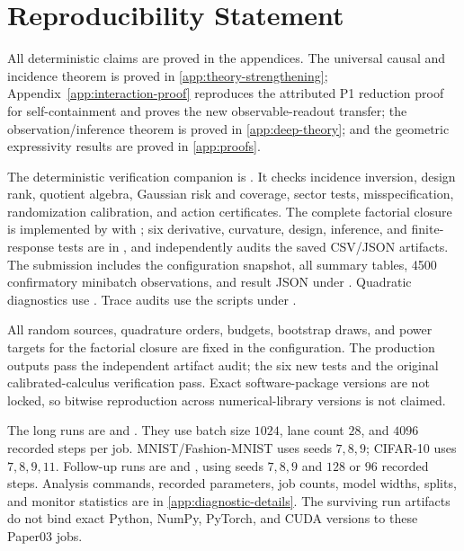 \section{Reproducibility Statement}
\label{sec:reproducibility}

All deterministic claims are proved in the appendices.  The universal causal and incidence theorem is proved in \cref{app:theory-strengthening}; Appendix~\ref{app:interaction-proof} reproduces the attributed P1 reduction proof for self-containment and proves the new observable-readout transfer; the observation/inference theorem is proved in \cref{app:deep-theory}; and the geometric expressivity results are proved in \cref{app:proofs}.

The deterministic verification companion is .  It checks incidence inversion, design rank, quotient algebra, Gaussian risk and coverage, sector tests, misspecification, randomization calibration, and action certificates.  The complete factorial closure is implemented by  with ; six derivative, curvature, design, inference, and finite-response tests are in , and  independently audits the saved CSV/JSON artifacts.  The submission includes the configuration snapshot, all summary tables, 4500 confirmatory minibatch observations, and result JSON under .  Quadratic diagnostics use .  Trace audits use the scripts under .

All random sources, quadrature orders, budgets, bootstrap draws, and power targets for the factorial closure are fixed in the configuration.  The production outputs pass the independent artifact audit; the six new tests and the original calibrated-calculus verification pass.  Exact software-package versions are not locked, so bitwise reproduction across numerical-library versions is not claimed.

The long runs are  and .  They use batch size $1024$, lane count $28$, and $4096$ recorded steps per job.  MNIST/Fashion-MNIST uses seeds $7,8,9$; CIFAR-10 uses $7,8,9,11$.  Follow-up runs are  and , using seeds $7,8,9$ and $128$ or $96$ recorded steps.  Analysis commands, recorded parameters, job counts, model widths, splits, and monitor statistics are in \cref{app:diagnostic-details}.  The surviving run artifacts do not bind exact Python, NumPy, PyTorch, and CUDA versions to these Paper03 jobs.

